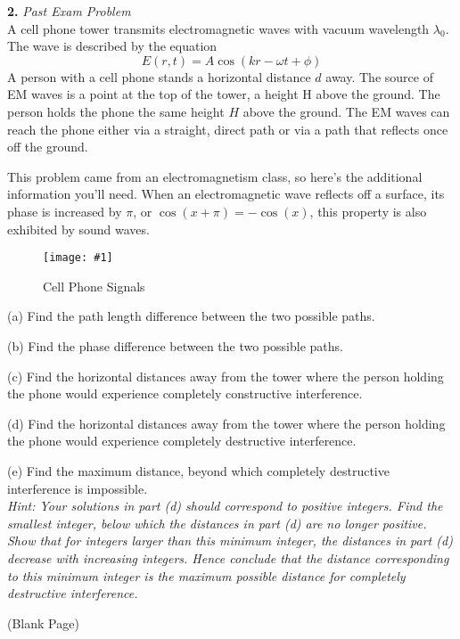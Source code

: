 \documentclass[11pt]{article}
\newcommand{\fig}[4]{
    \begin{figure}[H]
        \centering
        \texttt{[image: \#1]}
        \caption{#2}
        \label{exp4fit}
    \end{figure}
}
\theoremstyle{gangnamstyle}{\newtheorem{definition}{Definition}[]}
\theoremstyle{gangnamstyle}{\newtheorem{example}{Example}[]}
\theoremstyle{gangnamstyle}{\newtheorem{problem}{Problem}[]}
\begin{document}
\pagebreak

\textbf{2.} \textit{Past Exam Problem} \\
A cell phone tower transmits electromagnetic waves with vacuum wavelength $\lambda_0$. The wave is described by the equation
\[ E(r, t) = A\cos(kr - \omega t + \phi) \]
A person with a cell phone stands a horizontal distance $d$ away. The source of EM waves is a point at the top of the tower, a height H above the ground. The person holds the phone the same height $H$
above the ground. The EM waves can reach the phone either via a straight, direct path or via a path that reflects once off the ground.

This problem came from an electromagnetism class, so here's the additional information you'll need. When an electromagnetic wave reflects off a surface, its phase is increased by $\pi$, or $\cos(x + \pi) = -\cos(x)$, this property is also exhibited by sound waves. 

\fig{figs/0806/2.png}{Cell Phone Signals}{0.6}{0}

(a) Find the path length difference between the two possible paths.

(b) Find the phase difference between the two possible paths.

(c) Find the horizontal distances away from the tower where the person holding the phone would experience completely constructive interference.

(d) Find the horizontal distances away from the tower where the person holding the phone would experience completely destructive interference.

(e) Find the maximum distance, beyond which completely destructive interference is impossible. \\
\textit{Hint: Your solutions in part (d) should correspond to positive integers. Find the smallest integer, below which the distances in part (d) are no longer positive. Show that for integers larger than this minimum integer, the distances in part (d) decrease with increasing integers. Hence conclude that the distance corresponding to this minimum integer is the maximum possible distance for completely destructive interference.}

\pagebreak

\begin{center}
(Blank Page)
\end{center}

\pagebreak
\end{document}
